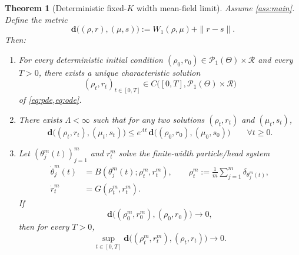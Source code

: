 \documentclass[11pt]{article}
\newtheorem{theorem}{Theorem}[section]
\theoremstyle{definition}
\newcommand{\PP}{\mathcal{P}}
\newcommand{\W}{W_1}
\begin{document}
\begin{theorem}[Deterministic fixed-$K$ width mean-field limit]
\label{thm:deterministic}
Assume \cref{ass:main}. Define the metric
\[
  \mathbf d\bigl((\rho,r),(\mu,s)\bigr)
  :=
  \W(\rho,\mu)+\|r-s\|.
\]
Then:
\begin{enumerate}[label=(\roman*),leftmargin=2em]
  \item For every deterministic initial condition $(\rho_0,r_0)\in\PP_1(\Theta)\times\mathcal R$ and every $T>0$, there exists a unique characteristic solution
  \[
    (\rho_t,r_t)_{t\in[0,T]}
    \in
    C\bigl([0,T],\PP_1(\Theta)\times\mathcal R\bigr)
  \]
  of \cref{eq:pde,eq:ode}.
  \item There exists $\Lambda<\infty$ such that for any two solutions $(\rho_t,r_t)$ and $(\mu_t,s_t)$,
  \begin{equation}
    \mathbf d\bigl((\rho_t,r_t),(\mu_t,s_t)\bigr)
    \le
    e^{\Lambda t}\,
    \mathbf d\bigl((\rho_0,r_0),(\mu_0,s_0)\bigr)
    \qquad
    \forall t\ge 0.
    \label{eq:det-stability}
  \end{equation}
  \item Let $(\theta_j^m(t))_{j=1}^m$ and $r_t^m$ solve the finite-width particle/head system
  \begin{align}
    \dot\theta_j^m(t)
    &=
    B(\theta_j^m(t);\rho_t^m,r_t^m),
    \qquad
    \rho_t^m:=\frac1m\sum_{j=1}^m \delta_{\theta_j^m(t)},
    \label{eq:particle}
    \\
    \dot r_t^m &= G(\rho_t^m,r_t^m).
    \label{eq:particle-r}
  \end{align}
  If
  \[
    \mathbf d\bigl((\rho_0^m,r_0^m),(\rho_0,r_0)\bigr)\to 0,
  \]
  then for every $T>0$,
  \begin{equation}
    \sup_{t\in[0,T]}
    \mathbf d\bigl((\rho_t^m,r_t^m),(\rho_t,r_t)\bigr)
    \to 0.
    \label{eq:det-conv}
  \end{equation}
\end{enumerate}
\end{theorem}
\end{document}
